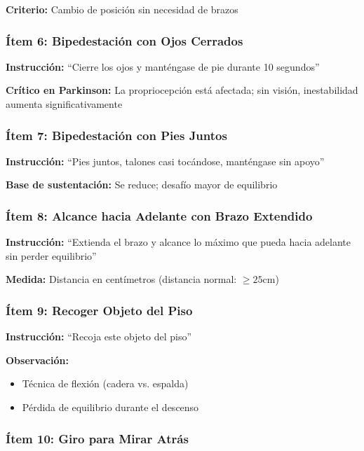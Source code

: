 \documentclass[12pt,a4paper,spanish,oneside]{book}
\begin{document}
\textbf{Criterio:} Cambio de posición sin necesidad de brazos

\subsubsection{Ítem 6: Bipedestación con Ojos Cerrados}

\textbf{Instrucción:} ``Cierre los ojos y manténgase de pie durante 10 segundos''

\textbf{Crítico en Parkinson:} La propriocepción está afectada; sin visión, inestabilidad aumenta significativamente

\subsubsection{Ítem 7: Bipedestación con Pies Juntos}

\textbf{Instrucción:} ``Pies juntos, talones casi tocándose, manténgase sin apoyo''

\textbf{Base de sustentación:} Se reduce; desafío mayor de equilibrio

\subsubsection{Ítem 8: Alcance hacia Adelante con Brazo Extendido}

\textbf{Instrucción:} ``Extienda el brazo y alcance lo máximo que pueda hacia adelante sin perder equilibrio''

\textbf{Medida:} Distancia en centímetros (distancia normal: $\geq 25$cm)

\subsubsection{Ítem 9: Recoger Objeto del Piso}

\textbf{Instrucción:} ``Recoja este objeto del piso''

\textbf{Observación:} 
\begin{itemize}
  \item Técnica de flexión (cadera vs. espalda)
  \item Pérdida de equilibrio durante el descenso
\end{itemize}

\subsubsection{Ítem 10: Giro para Mirar Atrás}
\end{document}
